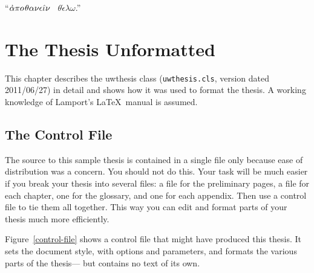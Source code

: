 \documentclass [11pt, twoside] {uwthesis}[2020/02/24]
\begin{document}
\medskip
\begin{center}
``$\mathaccent"7027\alpha\pi o\kern1pt\theta\alpha\nu\epsilon\hat\iota\nu$
\ $\theta\acute\epsilon\lambda\omega$.''
 
\end{center}
 
 
\chapter{The Thesis Unformatted}
 
This chapter describes the uwthesis class (\texttt{uwthesis.cls},
version dated 2011/06/27)
in detail 
and shows how it was used to format the thesis.
A working knowledge of Lamport's \LaTeX\ manual\cite{Lbook} is assumed.
 
\section{The Control File}
 
The source to this sample thesis is contained in a single file
only because ease of distribution was a concern.
You should not do this.  Your task will be much easier if you
break your thesis into several files:  a file for the preliminary pages,
a file for each chapter,  one for the glossary, and one for each
appendix.  Then use a control file to tie them all together.
This way you can edit and format parts of your thesis much more
efficiently.
 
Figure~\ref{control-file} shows a control file that
might have produced this thesis.
It sets the document style, with options and parameters,
and formats the various parts of the thesis---%
but contains no text of its own.
 
\end{document}
